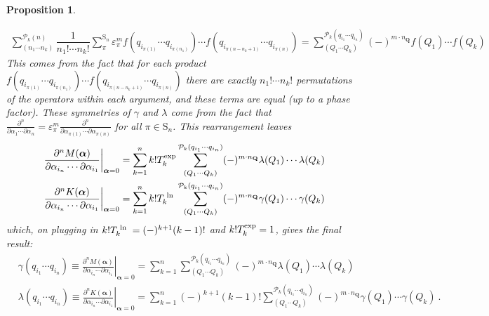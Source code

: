 \documentclass[11pt,fleqn]{article}
\renewcommand{\a}{\alpha}    %
\newcommand{\g}{\gamma}      %
\newcommand{\e}{\varepsilon} %
\newcommand{\la}{\lambda}    %
\newcommand{\cd}{\ensuremath{\cdots}}
\newcommand{\mc}[1]{\ensuremath{\mathcal{#1}}}
\newcommand{\mr}[1]{\ensuremath{\mathrm{#1}}}
\newcommand{\bo}[1]{\ensuremath{\mathbf{#1}}}
\newcommand{\ds}{\displaystyle}
\newcommand{\fr}[2]{\ensuremath{\dfrac{#1}{#2}}}
\newcommand{\pd}[2]{\ensuremath{\frac{\partial#1}{\partial#2}}}
\newcommand{\pt}{\ensuremath{\partial}}
\theoremstyle{mystyle}
\newtheorem{pro}{Proposition}[section]
\newcommand{\logbox}{\ensuremath{\text{\makebox[\widthof{exp}][c]{ln}}}}
\newcommand{\expbox}{\ensuremath{\text{\makebox[\widthof{exp}][c]{exp}}}}
\numberwithin{equation}{section}
\begin{document}
\begin{pro}
\begin{addmargin}[1em]{0em}
\begin{align*}
  \sum_{(n_1\cd n_k)}^{\mc{P}_k(n)}
  \fr{1}{n_1!\cd n_k!}
  \sum_{\pi}^{\mr{S}_n}
  \e_\pi^m
  f(q_{i_{\pi(1)}}\cd q_{i_{\pi(n_1)}})\cd f(q_{i_{\pi(n-n_k+1)}}\cd q_{i_{\pi(n)}})
=
  \sum_{(Q_1\cd Q_k)}^{\mc{P}_k(q_{i_1}\cd q_{i_n})}
  (-)^{m\cdot n_\bo{Q}}
  f(Q_1)\cd f(Q_k)
\end{align*}
This comes from the fact that for each product $f(q_{i_{\pi(1)}}\cd q_{i_{\pi(n_1)}})\cd f(q_{i_{\pi(n-n_k+1)}}\cd q_{i_{\pi(n)}})$ there are exactly $n_1!\cd n_k!$ permutations of the operators within each argument, and these terms are equal (up to a phase factor).
These symmetries of $\g$ and $\la$ come from the fact that $\ds\pd{^n}{\a_1\cd \pt\a_n}=\e_\pi^m\pd{^n}{\a_{\pi(1)}\cd \pt\a_{\pi(n)}}$ for all $\pi\in\mr{S}_n$.
This rearrangement leaves
\begin{align*}
&
  \left.
  \pd{^n M(\bm\a)}{\a_{i_n}\cd\pt\a_{i_1}}
  \right|_{\bm\a=0}
=
  \sum_{k=1}^n
  k! T_k^{\expbox}
  \sum_{(Q_1\cd Q_k)}^{\mc{P}_k(q_{i_1}\cd q_{i_n})}
  (-)^{m\cdot n_\bo{Q}}
  \la(Q_1)\cd \la(Q_k)
\\
&
  \left.
  \pd{^n K(\bm\a)}{\a_{i_n}\cd\pt\a_{i_1}}
  \right|_{\bm\a=0}
=
  \sum_{k=1}^n
  k! T_k^{\logbox}
  \sum_{(Q_1\cd Q_k)}^{\mc{P}_k(q_{i_1}\cd q_{i_n})}
  (-)^{m\cdot n_\bo{Q}}
  \g(Q_1)\cd \g(Q_k)
\end{align*}
which, on plugging in $k!T_k^{\logbox}=(-)^{k+1}(k-1)!$ and $k!T_k^{\expbox}=1$, gives the final result:
\begin{align*}
&
  \g(q_{i_1}\cd q_{i_n})
\equiv
  \left.
  \pd{^n M(\bm\a)}{\a_{i_n}\cd\pt\a_{i_1}}
  \right|_{\bm\a=0}
=
  \sum_{k=1}^n
  \sum_{(Q_1\cd Q_k)}^{\mc{P}_k(q_{i_1}\cd q_{i_n})}
  (-)^{m\cdot n_\bo{Q}}
  \la(Q_1)\cd \la(Q_k)
\\
&
  \la(q_{i_1}\cd q_{i_n})
\equiv
  \left.
  \pd{^n K(\bm\a)}{\a_{i_n}\cd\pt\a_{i_1}}
  \right|_{\bm\a=0}
=
  \sum_{k=1}^n
  (-)^{k+1}(k-1)!
  \sum_{(Q_1\cd Q_k)}^{\mc{P}_k(q_{i_1}\cd q_{i_n})}
  (-)^{m\cdot n_\bo{Q}}
  \g(Q_1)\cd \g(Q_k)\ .
\end{align*}
\end{addmargin}
\end{pro}
\end{document}

